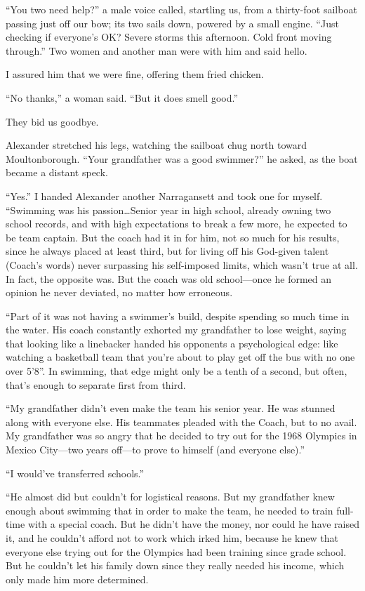 ``You two need help?'' a male voice called, startling us, from a
thirty-foot sailboat passing just off our bow; its two sails down,
powered by a small engine. ``Just checking if everyone's OK? Severe
storms this afternoon. Cold front moving through.'' Two women and
another man were with him and said hello.

I assured him that we were fine, offering them fried chicken.

``No thanks,'' a woman said. ``But it does smell good.''

They bid us goodbye.

Alexander stretched his legs, watching the sailboat chug north toward
Moultonborough. ``Your grandfather was a good swimmer?'' he asked, as
the boat became a distant speck.

``Yes.'' I handed Alexander another Narragansett and took one for
myself. ``Swimming was his passion\ldots Senior year in high school,
already owning two school records, and with high expectations to break a
few more, he expected to be team captain. But the coach had it in for
him, not so much for his results, since he always placed at least third,
but for living off his God-given talent (Coach's words) never surpassing
his self-imposed limits, which wasn't true at all. In fact, the opposite
was. But the coach was old school---once he formed an opinion he never
deviated, no matter how erroneous.

``Part of it was not having a swimmer's build, despite spending so much
time in the water. His coach constantly exhorted my grandfather to lose
weight, saying that looking like a linebacker handed his opponents a
psychological edge: like watching a basketball team that you're about to
play get off the bus with no one over 5'8''. In swimming, that edge
might only be a tenth of a second, but often, that's enough to separate
first from third.

``My grandfather didn't even make the team his senior year. He was
stunned along with everyone else. His teammates pleaded with the Coach,
but to no avail. My grandfather was so angry that he decided to try out
for the 1968 Olympics in Mexico City---two years off---to prove to
himself (and everyone else).''

``I would've transferred schools.''

``He almost did but couldn't for logistical reasons. But my grandfather
knew enough about swimming that in order to make the team, he needed to
train full-time with a special coach. But he didn't have the money, nor
could he have raised it, and he couldn't afford not to work which irked
him, because he knew that everyone else trying out for the Olympics had
been training since grade school. But he couldn't let his family down
since they really needed his income, which only made him more
determined.

